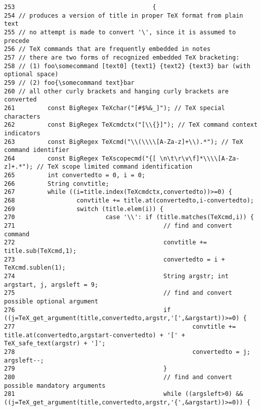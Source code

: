 \footnotesize\begin{verbatim}253                                      {
254 // produces a version of title in proper TeX format from plain text
255 // no attempt is made to convert '\', since it is assumed to precede
256 // TeX commands that are frequently embedded in notes
257 // there are two forms of recognized embedded TeX bracketing:
258 // (1) foo\somecommand [text0] {text1} {text2} {text3} bar (with optional space)
259 // (2) foo{\somecommand text}bar
260 // all other curly brackets and hanging curly brackets are converted
261         const BigRegex TeXchar("[#$%&_]"); // TeX special characters
262         const BigRegex TeXcmdctx("[\\{}]"); // TeX command context indicators
263         const BigRegex TeXcmd("\\(\\\\[A-Za-z]+\\).*"); // TeX command identifier
264         const BigRegex TeXscopecmd("{[ \n\t\r\v\f]*\\\\[A-Za-z]+.*"); // TeX scope limited command identification
265         int convertedto = 0, i = 0;
266         String convtitle;
267         while ((i=title.index(TeXcmdctx,convertedto))>=0) {
268                 convtitle += title.at(convertedto,i-convertedto);
269                 switch (title.elem(i)) {
270                         case '\\': if (title.matches(TeXcmd,i)) {
271                                         // find and convert command
272                                         convtitle += title.sub(TeXcmd,1);
273                                         convertedto = i + TeXcmd.sublen(1);
274                                         String argstr; int argstart, j, argsleft = 9;
275                                         // find and convert possible optional argument
276                                         if ((j=TeX_get_argument(title,convertedto,argstr,'[',&argstart))>=0) {
277                                                 convtitle += title.at(convertedto,argstart-convertedto) + '[' + TeX_safe_text(argstr) + ']';
278                                                 convertedto = j; argsleft--;
279                                         }
280                                         // find and convert possible mandatory arguments
281                                         while ((argsleft>0) && ((j=TeX_get_argument(title,convertedto,argstr,'{',&argstart))>=0)) {

\end{verbatim}
